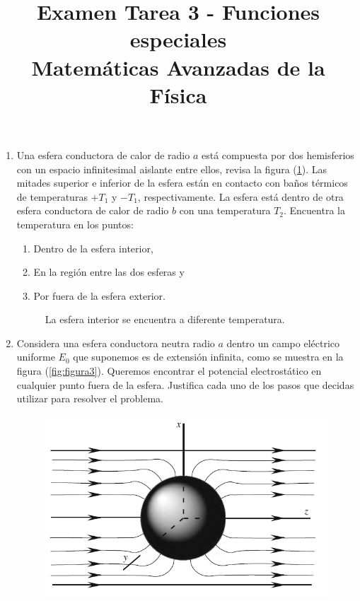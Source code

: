 
\marginsize{1cm}{1cm}{2cm}{2cm}
\pagestyle{fancy}
\fancyhf{}
\rfoot{\thepage}
\renewcommand{\headrulewidth}{0.5pt}
\setlength{\headheight}{30pt} 
\title{Examen Tarea 3 - Funciones especiales \\ \large{Matemáticas Avanzadas de la Física}}
\date{ }

\vspace{-4cm}
\maketitle
\fontsize{14}{14}\selectfont
\begin{enumerate}
\item Una esfera conductora de calor de radio $a$ está compuesta por dos hemisferios con un espacio infinitesimal aislante entre ellos, revisa la figura (\ref{fig:figura2}). Las mitades superior e inferior de la esfera están en contacto con baños térmicos de temperaturas $+ T_{1}$ y $-T_{1}$, respectivamente. La esfera está dentro de otra esfera conductora de calor de radio $b$ con una temperatura $T_{2}$. Encuentra la temperatura en los puntos:
\begin{enumerate}[label=\alph*)]
\item Dentro de la esfera interior,
\item En la región entre las dos esferas y
\item Por fuera de la esfera exterior.
\end{enumerate} 
\begin{figure}[!ht]
    \centering
    
    \caption{La esfera interior se encuentra a diferente temperatura.}
    \label{fig:figura2}
\end{figure}
\item Considera una esfera conductora neutra radio $a$ dentro un campo eléctrico uniforme  $E_{0}$ que suponemos es de extensión infinita, como se muestra en la figura (\ref{fig:figura3}). Queremos encontrar el potencial electrostático en cualquier punto fuera de la esfera. Justifica cada uno de los pasos que decidas utilizar para resolver el problema.
\begin{figure}[!ht]
    \centering
    \includegraphics[scale=0.35]{Imagenes/Esfera_Tarea5.png}

\end{figure}
\end{enumerate}
